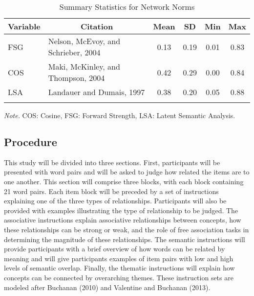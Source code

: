 \documentclass[english,man]{apa6}
\theoremstyle{definition}
\theoremstyle{definition}
\theoremstyle{definition}
\theoremstyle{remark}
\begin{document}
\begin{table}[tbp]
\begin{center}
\begin{threeparttable}
\caption{\label{tab:stim-table-network}Summary Statistics for Network Norms}
\begin{tabular}{llcccc}
\toprule
Variable & \multicolumn{1}{c}{Citation} & \multicolumn{1}{c}{Mean} & \multicolumn{1}{c}{SD} & \multicolumn{1}{c}{Min} & \multicolumn{1}{c}{Max}\\
\midrule
FSG & Nelson, McEvoy, and Schrieber, 2004 & 0.13 & 0.19 & 0.01 & 0.83\\
COS & Maki, McKinley, and Thompson, 2004 & 0.42 & 0.29 & 0.00 & 0.84\\
LSA & Landauer and Dumais, 1997 & 0.38 & 0.20 & 0.05 & 0.88\\
\bottomrule
\addlinespace
\end{tabular}
\begin{tablenotes}[para]
\textit{Note.} COS: Cosine, FSG: Forward Strength, LSA: Latent Semantic Analysis.
\end{tablenotes}
\end{threeparttable}
\end{center}
\end{table}

\subsection{Procedure}\label{procedure}

This study will be divided into three sections. First, participants will
be presented with word pairs and will be asked to judge how related the
items are to one another. This section will comprise three blocks, with
each block containing 21 word pairs. Each item block will be preceded by
a set of instructions explaining one of the three types of
relationships. Participants will also be provided with examples
illustrating the type of relationship to be judged. The associative
instructions explain associative relationships between concepts, how
these relationships can be strong or weak, and the role of free
association tasks in determining the magnitude of these relationships.
The semantic instructions will provide participants with a brief
overview of how words can be related by meaning and will give
participants examples of item pairs with low and high levels of semantic
overlap. Finally, the thematic instructions will explain how concepts
can be connected by overarching themes. These instruction sets are
modeled after Buchanan (2010) and Valentine and Buchanan (2013).
\end{document}
